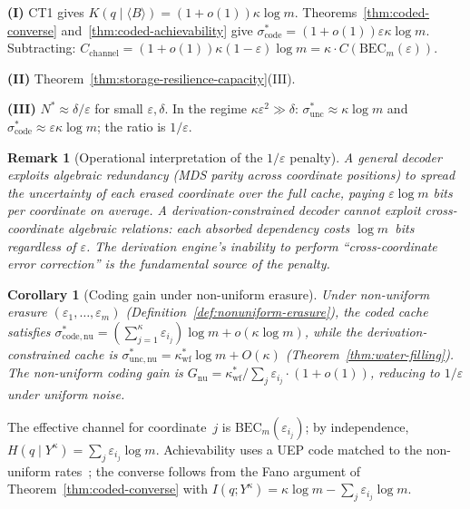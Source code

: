 \documentclass[journal]{IEEEtran}
\makeatletter
\newtheorem{corollary}{Corollary}[section]
\newtheorem{remark}{Remark}[section]
\numberwithin{equation}{section}
\renewenvironment{proof}[1][\proofname]{\par
  \pushQED{\qed}%
  \normalfont \topsep6\p@\@plus6\p@\relax
  \trivlist
  \item[\hskip\labelsep
        \itshape
    #1\@addpunct{.}]\ignorespaces
}{%
  \popQED\endtrivlist\@endpefalse
}
\makeatother
\begin{document}
\begin{proof}
\textbf{(I)}\;
CT1 gives
$K(q\mid\langle B\rangle)
=(1{+}o(1))\kappa\log m$.
Theorems~\ref{thm:coded-converse}
and~\ref{thm:coded-achievability} give
$\sigma^*_{\mathrm{code}}
=(1{+}o(1))\varepsilon\kappa\log m$.
Subtracting:
$C_{\mathrm{channel}}
=(1{+}o(1))\kappa(1{-}\varepsilon)\log m
=\kappa\cdot C(\mathrm{BEC}_m(\varepsilon))$.

\textbf{(II)}\;
Theorem~\ref{thm:storage-resilience-capacity}(III).

\textbf{(III)}\;
$N^*\approx\delta/\varepsilon$ for small $\varepsilon,\delta$.
In the regime $\kappa\varepsilon^2\gg\delta$:
$\sigma^*_{\mathrm{unc}}\approx\kappa\log m$ and
$\sigma^*_{\mathrm{code}}\approx\varepsilon\kappa\log m$;
the ratio is $1/\varepsilon$.
\end{proof}

\begin{remark}[Operational interpretation of the $1/\varepsilon$ penalty]
\label{rem:derivation-penalty}
A general decoder exploits \emph{algebraic redundancy}
(MDS parity across coordinate positions) to spread the
uncertainty of each erased coordinate over the full cache,
paying $\varepsilon\log m$ bits per coordinate on average.
A derivation-constrained decoder cannot exploit
cross-coordinate algebraic relations: each absorbed
dependency costs $\log m$~bits regardless of $\varepsilon$.
The derivation engine's inability to perform
``cross-coordinate error correction'' is the fundamental
source of the penalty.
\end{remark}

\begin{corollary}[Coding gain under non-uniform erasure]
\label{cor:coded-nonuniform}
Under non-uniform erasure
$(\varepsilon_1,\ldots,\varepsilon_m)$
\textup{(Definition~\ref{def:nonuniform-erasure})}, the coded
cache satisfies
$\sigma^*_{\mathrm{code,nu}}
=(\sum_{j=1}^{\kappa}\varepsilon_{i_j})\log m
+o(\kappa\log m)$,
while the derivation-constrained cache is
$\sigma^*_{\mathrm{unc,nu}}
=\kappa^*_{\mathrm{wf}}\log m+O(\kappa)$
\textup{(Theorem~\ref{thm:water-filling})}.
The non-uniform coding gain is
$G_{\mathrm{nu}}
=\kappa^*_{\mathrm{wf}}
 /\sum_{j}\varepsilon_{i_j}\cdot(1{+}o(1))$,
reducing to $1/\varepsilon$ under uniform noise.
\end{corollary}

\begin{proof}
The effective channel for coordinate~$j$ is
$\mathrm{BEC}_m(\varepsilon_{i_j})$; by independence,
$H(q\mid Y^\kappa)=\sum_j\varepsilon_{i_j}\log m$.
Achievability uses a UEP code matched to the non-uniform
rates~\cite{macwilliams1977theory,borade2009unequal};
the converse follows from the Fano argument of
Theorem~\ref{thm:coded-converse} with
$I(q;Y^\kappa)=\kappa\log m-\sum_j\varepsilon_{i_j}\log m$.
\end{proof}
\end{document}
